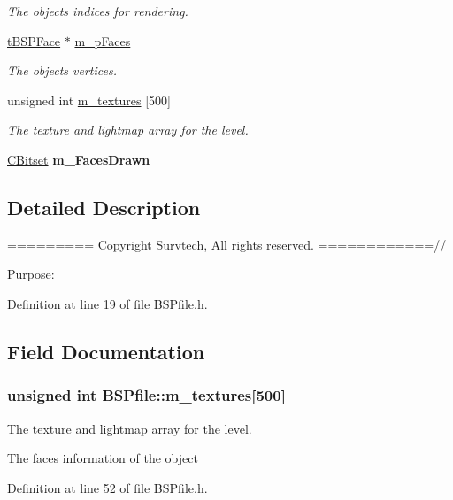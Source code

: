 \begin{DoxyCompactItemize}
\begin{DoxyCompactList}\small\item\em The object\textquotesingle{}s indices for rendering. \end{DoxyCompactList}\item 
\hyperlink{structt_b_s_p_face}{t\+B\+S\+P\+Face} $\ast$ \hyperlink{class_b_s_pfile_a229bf352e07fe5fc205925ef4bcd204c}{m\+\_\+p\+Faces}\hypertarget{class_b_s_pfile_a229bf352e07fe5fc205925ef4bcd204c}{}\label{class_b_s_pfile_a229bf352e07fe5fc205925ef4bcd204c}

\begin{DoxyCompactList}\small\item\em The object\textquotesingle{}s vertices. \end{DoxyCompactList}\item 
unsigned int \hyperlink{class_b_s_pfile_ade4ec8b0582ac55d498ce1d53b94a565}{m\+\_\+textures} \mbox{[}500\mbox{]}
\begin{DoxyCompactList}\small\item\em The texture and lightmap array for the level. \end{DoxyCompactList}\item 
\hyperlink{class_c_bitset}{C\+Bitset} {\bfseries m\+\_\+\+Faces\+Drawn}\hypertarget{class_b_s_pfile_a500f3a4700116398f61dcca78ceca484}{}\label{class_b_s_pfile_a500f3a4700116398f61dcca78ceca484}

\end{DoxyCompactItemize}


\subsection{Detailed Description}
========= Copyright Survtech, All rights reserved. ============//

Purpose\+: 

 

Definition at line 19 of file B\+S\+Pfile.\+h.



\subsection{Field Documentation}
\subsubsection[{\texorpdfstring{m\+\_\+textures}{m_textures}}]{\setlength{\rightskip}{0pt plus 5cm}unsigned int B\+S\+Pfile\+::m\+\_\+textures\mbox{[}500\mbox{]}\hspace{0.3cm}{\ttfamily [private]}}\hypertarget{class_b_s_pfile_ade4ec8b0582ac55d498ce1d53b94a565}{}\label{class_b_s_pfile_ade4ec8b0582ac55d498ce1d53b94a565}


The texture and lightmap array for the level. 

The faces information of the object 

Definition at line 52 of file B\+S\+Pfile.\+h.

